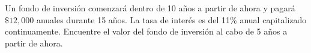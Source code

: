 \item Un fondo de inversión comenzará dentro de 10 años a partir de ahora y pagará $\$12,000$ anuales durante 15 años. La tasa de interés es del 11\% anual capitalizado continuamente. Encuentre el valor del fondo de inversión al cabo de 5 años a partir de ahora.
